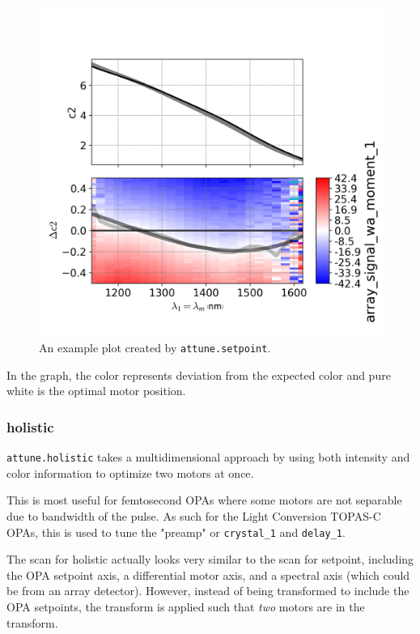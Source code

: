 \begin{figure}
\includegraphics{representation/images/setpoint.png}
\caption[Setpoint]{
	An example plot created by \texttt{attune.setpoint}.
}
\label{rep:fig:setpoint}
\end{figure}

In the graph, the color represents deviation from the expected color and
pure white is the optimal motor position.

\hypertarget{holistic}{%
\subsubsection{holistic}\label{holistic}}

\texttt{attune.holistic} takes a multidimensional
approach by using both intensity and color information to optimize two
motors at once.

This is most useful for femtosecond OPAs where some motors are not
separable due to bandwidth of the pulse. As such for the Light
Conversion TOPAS-C OPAs, this is used to tune the "preamp" or
\texttt{crystal\_1} and \texttt{delay\_1}.

The scan for holistic actually looks very similar to the scan for
setpoint, including the OPA setpoint axis, a differential motor axis,
and a spectral axis (which could be from an array detector). However,
instead of being transformed to include the OPA setpoints, the transform
is applied such that \emph{two} motors are in the transform.

